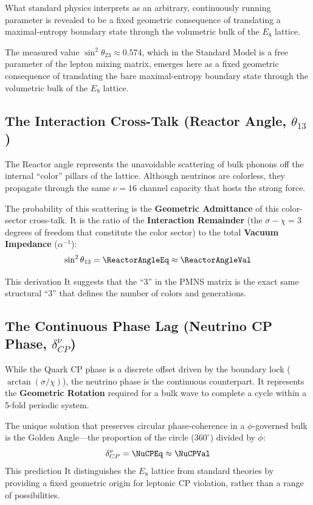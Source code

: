 What standard physics interprets as an arbitrary, continuously running parameter is revealed to be a fixed geometric consequence of translating a maximal-entropy boundary state through the volumetric bulk of the $E_8$ lattice.

The measured value $\sin^2 \theta_{23} \approx 0.574$, which in the Standard Model is a free parameter of the lepton mixing matrix, emerges here as a fixed geometric consequence of translating the bare maximal-entropy boundary state  through the volumetric bulk of the $E_8$ lattice.

\subsection{The Interaction Cross-Talk (Reactor Angle, \texorpdfstring{$\theta_{13}$}{theta 13})}

The Reactor angle represents the unavoidable scattering of bulk phonons off the internal ``color'' pillars of the lattice. Although neutrinos are colorless, they propagate through the same $\nu=16$ channel capacity that hosts the strong force. 

The probability of this scattering is the \textbf{Geometric Admittance} of this color-sector cross-talk. It is the ratio of the \textbf{Interaction Remainder} (the $\sigma-\chi=3$ degrees of freedom that constitute the color sector) to the total \textbf{Vacuum Impedance} ($\alpha^{-1}$):
\begin{equation}
    \sin^2 \theta_{13} = \ReactorAngleEq \approx \mathbf{\ReactorAngleVal}
\end{equation}

This derivation \ReactorAngleAccText It suggests that the ``3'' in the PMNS matrix is the exact same structural ``3'' that defines the number of colors and generations.

\subsection{The Continuous Phase Lag (Neutrino CP Phase, \texorpdfstring{$\delta_{CP}^\nu$}{delta cpnu})}

While the Quark CP phase is a discrete offset driven by the boundary lock ($\arctan(\sigma/\chi)$), the neutrino phase is the continuous counterpart. It represents the \textbf{Geometric Rotation} required for a bulk wave to complete a cycle within a 5-fold periodic system. 

The unique solution that preserves circular phase-coherence in a $\phi$-governed bulk is the Golden Angle—the proportion of the circle ($360^\circ$) divided by $\phi$:
\begin{equation}
    \delta_{CP}^\nu = \NuCPEq \approx \mathbf{\NuCPVal}
\end{equation}
This prediction \NuCPAccText It distinguishes the $E_8$ lattice from standard theories by providing a fixed geometric origin for leptonic CP violation, rather than a range of possibilities.

